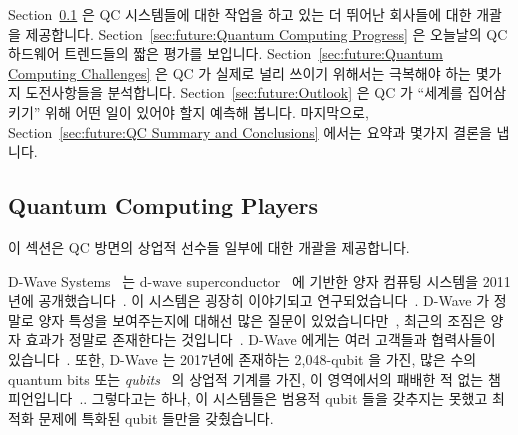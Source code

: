 Section~\ref{sec:future:Quantum Computing Players}
은 QC 시스템들에 대한 작업을 하고 있는 더 뛰어난 회사들에 대한 개괄을
제공합니다.
Section~\ref{sec:future:Quantum Computing Progress}
은 오늘날의 QC 하드웨어 트렌드들의 짧은 평가를 보입니다.
Section~\ref{sec:future:Quantum Computing Challenges}
은 QC 가 실제로 널리 쓰이기 위해서는 극복해야 하는 몇가지 도전사항들을
분석합니다.
Section~\ref{sec:future:Outlook} 은 QC 가 ``세계를 집어삼키기'' 위해 어떤 일이
있어야 할지 예측해 봅니다.
마지막으로,
Section~\ref{sec:future:QC Summary and Conclusions}
에서는 요약과 몇가지 결론을 냅니다.

\subsection{Quantum Computing Players}
\label{sec:future:Quantum Computing Players}

이 섹션은 QC 방면의 상업적 선수들 일부에 대한 개괄을 제공합니다.

D-Wave Systems~\cite{D-WaveSystemsHomePage} 는 d-wave
superconductor~\cite{MHSAmin2000D-Wave-superconductor} 에 기반한 양자 컴퓨팅
시스템을 2011년에 공개했습니다~\cite{WikipediaD-WaveSystems}.
이 시스템은 굉장히 이야기되고
연구되었습니다~\cite{KamranKarimi2011D-WaveAdiabatic}.
D-Wave 가 정말로 양자 특성을 보여주는지에 대해선 많은 질문이
있었습니다만~\cite{SeungWooShin2014IsDwaveQuantum}, 최근의 조짐은 양자 효과가
정말로 존재한다는 것입니다~\cite{PhysRevA.91.042314,PhysRevX.4.021041}.
D-Wave 에게는 여러 고객들과 협력사들이
있습니다~\cite{JeffreyBurt2014Google-QC-Chip,PatrickHarris2015QC-Google-NASA-DWave,ToddRWeiss2013Google-QC-AI-Lab}.
또한, D-Wave 는 2017년에 존재하는 2,048-qubit 을 가진, 많은 수의 quantum bits
또는 \emph{qubits}~\cite{WikipediaD-WaveSystems} 의 상업적 기계를 가진, 이
영역에서의 패배한 적 없는
챔피언입니다~\cite{AgamShah2016D-Wave-2000-qubit,BradJones2017D-Wave2000Sale}..
그렇다고는 하나, 이 시스템들은 범용적 qubit 들을 갖추지는 못했고 최적화 문제에
특화된 qubit 들만을 갖췄습니다.
\iffalse


